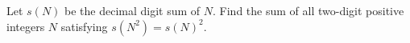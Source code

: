 Let $s(N)$ be the decimal digit sum of $N$. Find the sum of all two-digit positive integers $N$ satisfying $s(N^2)=s(N)^2$.

